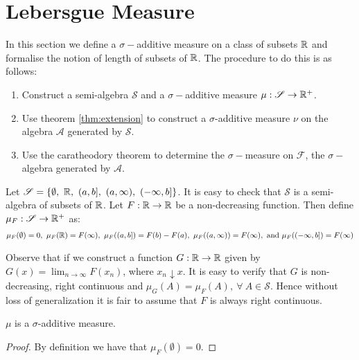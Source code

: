 \section{Lebersgue Measure}
In this section we define a $\sigma-$additive measure on a class of subsets $\mathbb{R}$ and formalise the notion of length of subsets of $\mathbb{R}$. The procedure to do this is as follows:
\begin{enumerate}
  \item Construct a semi-algebra $ \mathscr{S}$ and a $\sigma-$additive measure $\mu: \mathscr{S}\to \mathbb{R}^+$.
  \item Use theorem \cref{thm:extension} to construct a $\sigma$-additive measure $\nu$ on the algebra $ \mathscr{A}$ generated by $ \mathscr{S}$.
  \item Use the caratheodory theorem to determine the $\sigma-$measure on $ \mathscr{F}$, the $\sigma-$algebra generated by $ \mathscr{A}$.
\end{enumerate}
\begin{definition}  
Let $ \mathscr{S} = \{ \emptyset,\ \R,\ (a,b],\ (a,\infty),\ (-\infty, b]\}$. It is easy to check that $ \mathscr{S}$ is a semi-algebra of subsets of $\mathbb{R}$. Let $F:\mathbb{R}\to\mathbb{R}$ be a non-decreasing function. Then define $\mu_F: \mathscr{S}\to \mathbb{R}^+$ as:
\begin{align*}
  \mu_F(\emptyset) = 0,\ \mu_F(\mathbb{R})=F(\infty),\ \mu_F((a,b]) = F(b)-F(a),\ \mu_F((a,\infty))=F(\infty),\ \text{and}\ \mu_F((-\infty,b]) = F(\infty)
\end{align*}
\end{definition}
\begin{remark}
  Observe that if we construct a function $G:\mathbb{R}\to\mathbb{R}$ given by $G(x) = \lim_{n\to\infty} F(x_n)$, where $x_n \downarrow x$. It is easy to verify that $G$ is non-decreasing, right continuous and $\mu_G(A) = \mu_F(A),\ \forall\ A \in \mathscr{S}$. Hence without loss of generalization it is fair to assume that $F$ is always right continuous.
\end{remark}
\begin{proposition}
  $\mu$ is a $\sigma$-additive measure.
\end{proposition}
\begin{proof}
  By definition we have that $\mu_F(\emptyset) = 0$. 
\end{proof}
